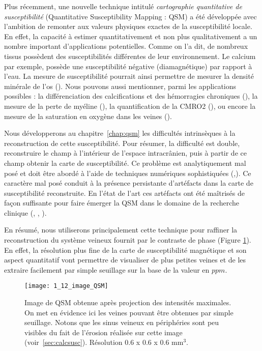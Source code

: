 Plus récemment, une nouvelle technique intitulé {\em cartographie quantitative de susceptibilité} (Quantitative Susceptibility Mapping : QSM) a été développée avec l’ambition de remonter aux valeurs physiques exactes de la susceptibilité locale. En effet, la capacité à estimer quantitativement et non plus qualitativement a un nombre important d’applications potentielles. Comme on l'a dit, de nombreux tissus possèdent des susceptibilités différentes de leur environnement. Le calcium par exemple, possède une susceptibilité négative (diamagnétique) par rapport à l’eau. La mesure de susceptibilité pourrait ainsi permettre de mesurer la densité minérale de l’os (\cite{Chung1996}). Nous pouvons aussi mentionner, parmi les applications possibles : la différenciation des calcifications et des hémorragies chroniques (\cite{Kozic2009}), la mesure de la perte de myéline (\cite{Liu2011}), la quantification de la CMRO2 (\cite{Zhang2014}), ou encore la mesure de la saturation en oxygène dans les veines (\cite{Fan2014}).

Nous développerons au chapitre~\ref{chap:qsm} les difficultés intrinsèques à la reconstruction de cette susceptibilité. Pour résumer, la difficulté est double, reconstruire le champ à l’intérieur de l’espace intracrânien, puis à partir de ce champ obtenir la carte de susceptibilité. Ce problème est analytiquement mal posé et doit être abordé à l’aide de techniques numériques sophistiquées (\cite{Haacke2005},\cite{Shmueli2009}). Ce caractère mal posé conduit à la présence persistante d’artéfacts dans la carte de susceptibilité reconstruite. En l’état de l’art ces artéfacts ont été maîtrisés de façon suffisante pour faire émerger la QSM dans le domaine de la recherche clinique (\cite{Wang_Liu_2014}, \cite{Bilgic2013}, \cite{Deistung2013}).

En résumé, nous utiliserons principalement cette technique pour raffiner la reconstruction du système veineux fournit par le contraste de phase (Figure \ref{fig:1_12_image_QSM}). En effet, la résolution plus fine de la carte de susceptibilité magnétique et son aspect quantitatif vont permettre de visualiser de plus petites veines et de les extraire facilement par simple seuillage sur la base de la valeur en $ppm$.
\begin{figure}[!t]
\centering
\texttt{[image: 1\_12\_image\_QSM]}
\caption{Image de QSM obtenue après projection des intensités maximales. On met en évidence ici les veines pouvant être obtenues par simple seuillage. Notons que les sinus veineux en périphéries sont peu visibles du fait de l’érosion réalisée sur cette image (voir~\ref{sec:calcsusc}). Résolution 0.6 x 0.6 x 0.6 mm$^3$.}
\label{fig:1_12_image_QSM}	
\end{figure}

